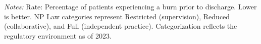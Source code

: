 \begin{table}[htbp]
    \centering
    \caption{Summary of ASC-1: Patient Burns Rate by Authority and Year}
    \label{tab:asc_rate_1}
    \vspace{0.2cm}
    \vspace{0.1cm}
    \begin{minipage}{\textwidth}
        \footnotesize \textit{Notes:} Rate: Percentage of patients experiencing a burn prior to discharge. Lower is better. NP Law categories represent Restricted (supervision), Reduced (collaborative), and Full (independent practice). Categorization reflects the regulatory environment as of 2023.
    \end{minipage}
\end{table}
